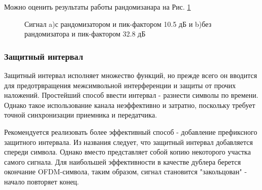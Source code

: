 Можно оценить результаты работы рандомизанара на Рис. \ref{fg:with|without}

\begin{figure}[H]
\begin{minipage}[h]{\linewidth}
\end{minipage}

\begin{minipage}[h]{\linewidth}
\end{minipage}
\caption{Сигнал a)с рандомизатором и пик-фактором 10.5 дБ и b)без рандомизатора и пик-фактором 32.8 дБ}
\label{fg:with|without}
\end{figure}

\subsubsection*{Защитный интервал}

Защитный интервал исполняет множество функций, но прежде всего он  вводится для предотрвращения межсимвольной интерференции и защиты от прочих наложений.
Простейший способ ввести интервал - разнести символы по времени. 
Однако такое использование канала неэффективно и затратно, поскольку требует точной синхронизации приемника и передатчика.

Рекомендуется реализовать более эффективный способ -  добавление префиксного защитного интервала.
Из названия следует, что защитный интервал добавляется спереди символа.
Однако вместо представляет собой копию  некоторого участка самого сигнала. 
Для наибольшей эффективности в качестве дублера берется окончание OFDM-символа, таким образом, сигнал становится "закольцован" - начало повторяет конец. 

